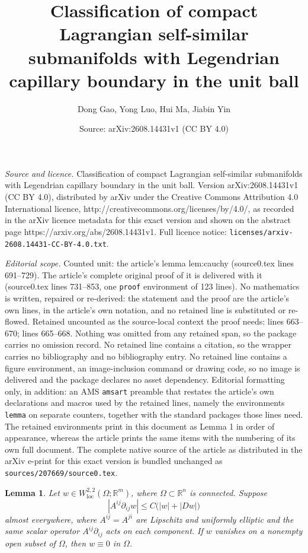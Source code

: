 \documentclass[10pt,a4paper]{amsart}
\title{Classification of compact Lagrangian self-similar submanifolds with Legendrian capillary boundary in the unit ball}
\author{Dong Gao, Yong Luo, Hui Ma, Jiabin Yin}
\date{Source: arXiv:2608.14431v1 (CC BY 4.0)}
\newtheorem{lemma}{Lemma}
\newcommand{\R}{\mathbb R}
\begin{document}
\maketitle

\noindent\emph{Source and licence.} Classification of compact Lagrangian self-similar submanifolds with Legendrian capillary boundary in the unit ball. Version arXiv:2608.14431v1 (CC BY 4.0), distributed by arXiv under the Creative Commons Attribution 4.0 International licence, http://creativecommons.org/licenses/by/4.0/, as recorded in the arXiv licence metadata for this exact version and shown on the abstract page https://arxiv.org/abs/2608.14431v1. Full licence notice: \texttt{licenses/arxiv-2608.14431-CC-BY-4.0.txt}.\par\smallskip

\noindent\textit{Editorial scope.} Counted unit: the article's lemma lem:cauchy (source0.tex lines 691--729). The article's complete original proof of it is delivered with it (source0.tex lines 731--853, one \texttt{proof} environment of 123 lines). No mathematics is written, repaired or re-derived: the statement and the proof are the article's own lines, in the article's own notation, and no retained line is substituted or re-flowed.  Retained uncounted as the source-local context the proof needs: lines 663--670; lines 665--668.  Nothing was omitted from any retained span, so the package carries no omission record.  No retained line contains a citation, so the wrapper carries no bibliography and no bibliography entry.  No retained line contains a figure environment, an image-inclusion command or drawing code, so no image is delivered and the package declares no asset dependency.  Editorial formatting only, in addition: an AMS \texttt{amsart} preamble that restates the article's own declarations and macros used by the retained lines, namely the environments \texttt{lemma} on separate counters, together with the standard packages those lines need.  The retained environments print in this document as Lemma 1 in order of appearance, whereas the article prints the same items with the numbering of its own full document.  The complete native source of the article as distributed in the arXiv e-print for this exact version is bundled unchanged as \texttt{sources/207669/source0.tex}.
\begin{lemma}\label{lem:ucp-external}
Let $w\in W^{2,2}_{\mathrm{loc}}(\Omega;\R^m)$, where $\Omega\subset\R^n$ is connected.  Suppose
\begin{equation}\label{eq:ucp-inequality}
        |A^{ij}\partial_{ij}w|
        \le C\bigl(|w|+|Dw|\bigr)
\end{equation}
almost everywhere, where $A^{ij}=A^{ji}$ are Lipschitz and uniformly elliptic and the same scalar operator $A^{ij}\partial_{ij}$ acts on each component.  If $w$ vanishes on a nonempty open subset of $\Omega$, then $w\equiv0$ in $\Omega$.
\end{lemma}
\end{document}
